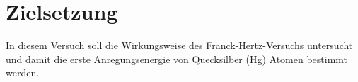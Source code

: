 \section{Zielsetzung}
\label{sec:Zielsetzung}


In diesem Versuch soll die Wirkungsweise des Franck-Hertz-Versuchs untersucht und damit die erste Anregungsenergie von Quecksilber (Hg) Atomen bestimmt werden.